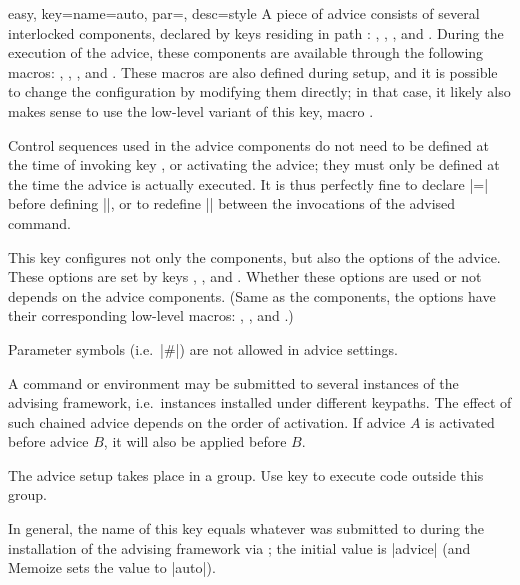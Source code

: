 \documentclass[a4paper,11pt]{article}
\begin{document}
\begin{doc}{easy,
    key={name=auto, par=, desc=style}}
  A piece of advice consists of several interlocked components, declared by keys
  residing in path : ,
  , ,
   and .  During the execution
  of the advice, these components are available through the following macros:
  , ,
  ,  and
  .  These macros are also defined during setup, and
  it is possible to change the configuration by modifying them directly; in
  that case, it likely also makes sense to use the low-level variant of this
  key, macro .

  Control sequences used in the advice components do not need to be defined at
  the time of invoking key , or activating the advice; they must
  only be defined at the time the advice is actually executed.  It is thus
  perfectly fine to declare |=\myinnerhandler| before
  defining |\myinnerhandler|, or to redefine |\myinnerhandler| between the
  invocations of the advised command.

  This key configures not only the components, but also the options of the
  advice.  These options are set by keys ,
  ,  and
  .  Whether these options are used or not depends on the
  advice components.  (Same as the components, the options have their
  corresponding low-level macros: ,
  ,  and
  .)

  Parameter symbols (i.e.\ |#|) are not allowed in advice settings.

  A command or environment may be submitted to several instances of the
  advising framework, i.e.\ instances installed under different keypaths.  The
  effect of such chained advice depends on the order of activation.  If advice
  $A$ is activated before advice $B$, it will also be applied before $B$.

  The advice setup takes place in a group.  Use key  to
  execute code outside this group.
 
  In general, the name of this key equals whatever was submitted to
   during the installation of the advising
  framework via ; the initial value is
  |advice| (and Memoize sets the value to |auto|).
\end{doc}
\end{document}

